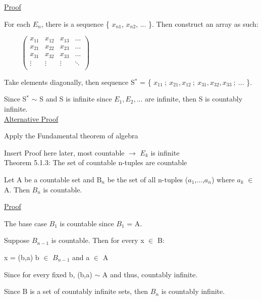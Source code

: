 	{ \color{magenta} \underline{Proof} } 
	
		For each $E_n$, there is a sequence \{ $x_{n1}$, $x_{n2}$, ... \}.
		Then construct an array as such:

		$ \hspace{1cm}
		\left(
		\begin{array}{cccc}
			x_{11} & x_{12} & x_{13} & ... \\
			x_{21} & x_{22} & x_{23} & ... \\
			x_{31} & x_{32} & x_{33} & ... \\
			\vdots & \vdots & \vdots & \ddots \\
		\end{array}
		\right)
		$
		
		Take elements diagonally, then sequence S$^*$ =
		\{ $x_{11} \ ; \ x_{21}, x_{12} \ ; \ x_{31}, x_{32}, x_{33} \ ; \ ... $ \}.
		
		\begin{adjustbox}{minipage=15cm, right}
			Since S$^*$ $\sim$ S and S is infinite since $E_1, E_2, ...$ are infinite,
			then S is countably infinite. \\
		\end{adjustbox}

	{ \color{magenta} \underline{Alternative Proof} } 

		Apply the Fundamental theorem of algebra

		{\color{red} Insert Proof here later, most countable $\rightarrow$ $E_k$ is infinite} \\
	

{ \color{red} Theorem 5.1.3: The set of countable n-tuples are countable } 

	\begin{adjustbox}{minipage=14cm, right}
		Let A be a countable set and B$_n$ be the set of all n-tuples ($a_1$,...,$a_n$)
		where $a_k$ $\in$ A. Then $B_n$ is countable.
	\end{adjustbox}

	{ \color{magenta} \underline{Proof} } 
	
	The base case $B_1$ is countable since $B_1$ = A.

	Suppose $B_{n-1}$ is countable. Then for every x $\in$ B:

	\qquad x = (b,a) \qquad \qquad b $\in$ $B_{n-1}$ and a $\in$ A

	Since for every fixed b, (b,a) $\sim$ A and thus, countably infinite.

	Since B is a set of countably infinite sets, then $B_{n}$
	is countably infinite. \\

